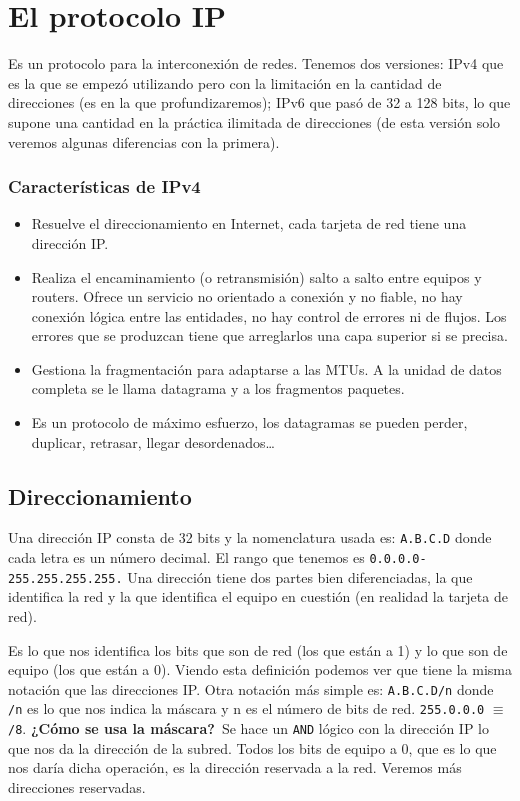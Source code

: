 \section{El protocolo IP}

Es un protocolo para la interconexión de redes.
Tenemos dos versiones: IPv4 que es la que se empezó utilizando pero con la limitación en la cantidad de direcciones (es en la que profundizaremos); IPv6 que pasó de 32 a 128 bits, lo que supone una cantidad en la práctica ilimitada de direcciones (de esta versión solo veremos algunas diferencias con la primera). 

\subsubsection{Características de IPv4}
\begin{itemize}
    \item Resuelve el direccionamiento en Internet, cada tarjeta de red tiene una dirección IP\@.
    \item Realiza el encaminamiento (o retransmisión) salto a salto entre equipos y routers. Ofrece un servicio no orientado a conexión y no fiable, no hay conexión lógica entre las entidades, no hay control de errores ni de flujos. Los errores que se produzcan tiene que arreglarlos una capa superior si se precisa. 
    \item Gestiona la fragmentación para adaptarse a las MTUs. A la unidad de datos completa se le llama datagrama y a los fragmentos paquetes. 
    \item Es un protocolo de máximo esfuerzo, los datagramas se pueden perder, duplicar, retrasar, llegar desordenados\ldots
\end{itemize}

\subsection{Direccionamiento}

Una dirección IP consta de 32 bits y la nomenclatura usada es: \verb|A.B.C.D| donde cada letra es un número decimal. El rango que tenemos es \verb|0.0.0.0-255.255.255.255.| Una dirección tiene dos partes bien diferenciadas, la que identifica la red y la que identifica el equipo en cuestión (en realidad la tarjeta de red). \

\begin{definicion}
    Es lo que nos identifica los bits que son de red (los que están a 1) y lo que son de equipo (los que están a 0). Viendo esta definición podemos ver que tiene la misma notación que las direcciones IP\@. Otra notación más simple es: \verb|A.B.C.D/n| donde \verb|/n| es lo que nos indica la máscara y n es el número de bits de red. \verb|255.0.0.0| $\equiv$ \verb|/8|.
\textbf{¿Cómo se usa la máscara?}\
Se hace un \verb|AND| lógico con la dirección IP lo que nos da la dirección de la subred. Todos los bits de equipo a 0, que es lo que nos daría dicha operación, es la dirección reservada a la red. Veremos más direcciones reservadas. \
\end{definicion}

